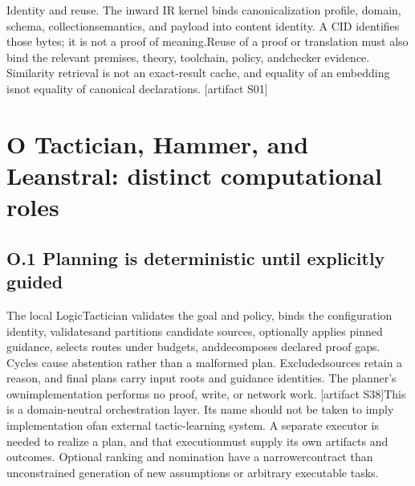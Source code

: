 \noindent
Identity and reuse. The inward IR kernel binds canonicalization profile, domain, schema, collection\linebreak[4]
semantics, and payload into content identity. A CID identifies those bytes; it is not a proof of meaning.\linebreak[4]
Reuse of a proof or translation must also bind the relevant premises, theory, toolchain, policy, and\linebreak[4]
checker evidence. Similarity retrieval is not an exact-result cache, and equality of an embedding is\linebreak[4]
not equality of canonical declarations. [artifact S01]\par

\section*{O  Tactician, Hammer, and Leanstral: distinct computational roles}

\subsection*{O.1  Planning is deterministic until explicitly guided}
\noindent
The local LogicTactician validates the goal and policy, binds the configuration identity, validates\linebreak[4]
and partitions candidate sources, optionally applies pinned guidance, selects routes under budgets, and\linebreak[4]
decomposes declared proof gaps. Cycles cause abstention rather than a malformed plan. Excluded\linebreak[4]
sources retain a reason, and final plans carry input roots and guidance identities. The planner's own\linebreak[4]
implementation performs no proof, write, or network work. [artifact S38]\linebreak[4]
This is a domain-neutral orchestration layer. Its name should not be taken to imply implementation of\linebreak[4]
an external tactic-learning system. A separate executor is needed to realize a plan, and that execution\linebreak[4]
must supply its own artifacts and outcomes. Optional ranking and nomination have a narrower\linebreak[4]
contract than unconstrained generation of new assumptions or arbitrary executable tasks.\par


